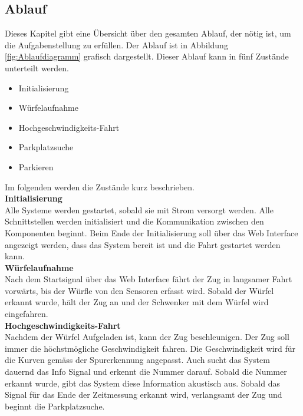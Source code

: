 \documentclass[../../main.tex]{subfiles}
\begin{document}
    \subsection{Ablauf} \label{ablauf}
    Dieses Kapitel gibt eine Übersicht über den gesamten Ablauf, der nötig ist, um die Aufgabenstellung zu erfüllen. Der Ablauf ist in Abbildung \ref{fig:Ablaufdiagramm} grafisch dargestellt. Dieser Ablauf kann in fünf Zustände unterteilt werden.

    \begin{itemize}
        \item Initialisierung
        \item Würfelaufnahme
        \item Hochgeschwindigkeits-Fahrt
        \item Parkplatzsuche
        \item Parkieren
    \end{itemize}

    Im folgenden werden die Zustände kurz beschrieben.\\

    \textbf{Initialisierung}\\
    Alle Systeme werden gestartet, sobald sie mit Strom versorgt werden. Alle Schnittstellen werden initialisiert und die Kommunikation zwischen den Komponenten beginnt. Beim Ende der Initialisierung soll über das Web Interface angezeigt werden, dass das System bereit ist und die Fahrt gestartet werden kann.\\

    \textbf{Würfelaufnahme}\\
    Nach dem Startsignal über das Web Interface fährt der Zug in langsamer Fahrt vorwärts, bis der Würfle von den Sensoren erfasst wird. Sobald der Würfel erkannt wurde, hält der Zug an und der Schwenker mit dem Würfel wird eingefahren.\\

    \textbf{Hochgeschwindigkeits-Fahrt}\\
    Nachdem der Würfel Aufgeladen ist, kann der Zug beschleunigen. Der Zug soll immer die höchstmögliche Geschwindigkeit fahren. Die Geschwindigkeit wird für die Kurven gemäss der Spurerkennung angepasst. Auch sucht das System dauernd das Info Signal und erkennt die Nummer darauf. Sobald die Nummer erkannt wurde, gibt das System diese Information akustisch aus.
    Sobald das Signal für das Ende der Zeitmessung erkannt wird, verlangsamt der Zug und beginnt die Parkplatzsuche.\\
\end{document}
